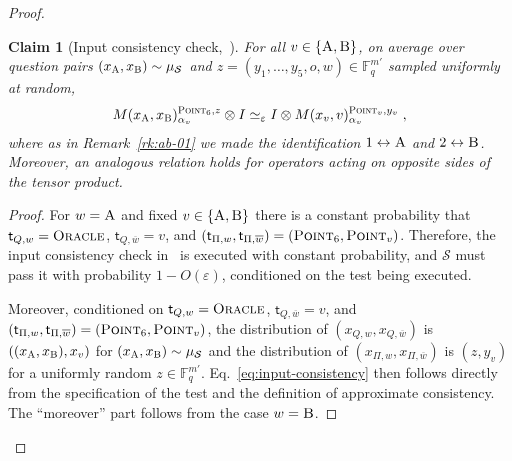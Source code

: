 \documentclass[11pt]{article}
\newtheorem{claim}[theorem]{Claim}
\theoremstyle{definition}
\newcommand{\ol}[1]{\overline{#1}}
\newcommand{\F}{\ensuremath{\mathbb{F}}}
\newcommand{\ot}{\otimes}
\newcommand{\eps}{\varepsilon}
\newcommand{\sampler}{\mathcal{S}}
\newcommand{\strategy}{\mathscr{S}}
\newcommand{\labelstyle}[1]{\ensuremath{\textsc{#1}}\xspace}
\newcommand{\tvarstyle}[1]{\mathsf{#1}}
\newcommand{\tvar}{\ensuremath{\tvarstyle{t}}}
\newcommand{\alice}{\labelstyle{A}}
\newcommand{\bob}{\labelstyle{B}}
\newcommand{\oracle}{\labelstyle{Oracle}}
\newcommand{\typestyle}[1]{\ensuremath{\textsc{#1}}\xspace}
\newcommand{\Point}{\typestyle{Point}}
\begin{document}
\begin{proof}
  \begin{claim}[Input consistency check,~]
    \label{claim:ar-2}
    For all $v \in \{\alice,\bob\}$, on average over question pairs
    $({x}_\alice, {x}_\bob) \sim \mu_{\sampler}$ and $z=(y_1,\ldots,y_5,o,w)\in
    \F_q^{m'}$ sampled uniformly at random,
    \begin{equation}
      M({x}_\alice, {x}_\bob)^{\Point_6, z}_{\alpha_v} \ot I \simeq_{\eps} I \ot
      M(x_v,v)^{ \Point_v, y_v}_{\alpha_v}\;, \label{eq:input-consistency}
    \end{equation}
    where as in Remark~\ref{rk:ab-01} we made the identification
    $1\leftrightarrow \alice$ and $2\leftrightarrow \bob$.
    Moreover, an analogous relation holds for operators acting on opposite sides
    of the tensor product.
  \end{claim}

	\begin{proof}
    For $w=\alice$ and fixed $v\in\{\alice,\bob\}$ there is a constant
    probability that $\tvar_{Q,w} = \oracle$, $\tvar_{Q,\ol{w}}=v$, and
    $(\tvar_{\Pi,w},\tvar_{\Pi, \ol{w}}) = (\Point_6, \Point_{v})$.
    Therefore, the input consistency check in~ is
    executed with constant probability, and $\strategy$ must pass it with
    probability $1-O(\eps)$, conditioned on the test being executed.

    Moreover, conditioned on $\tvar_{Q,w} = \oracle$, $\tvar_{Q,\ol{w}}=v$, and
    $(\tvar_{\Pi,w},\tvar_{\Pi, \ol{w}}) = (\Point_6, \Point_{v})$, the
    distribution of $(x_{Q,w},x_{Q,\overline{w}})$ is $((x_\alice,x_\bob),x_v)$
    for $(x_\alice,x_\bob)\sim \mu_\sampler$ and the distribution of
    $(x_{\Pi,w},x_{\Pi,\overline{w}})$ is $(z,y_v)$ for a uniformly random $z
    \in \F_q^{m'}$.
    Eq.~\eqref{eq:input-consistency} then follows directly from the
    specification of the test and the definition of approximate consistency.
    The ``moreover'' part follows from the case $w=\bob$.
  \end{proof}
	

\end{proof}
\end{document}
